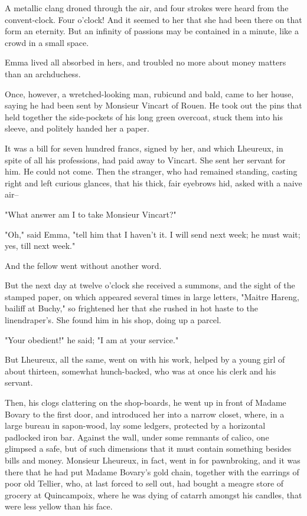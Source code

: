 \documentclass{tufte-book}
\begin{document}
A metallic clang droned through the air, and four strokes were heard
from the convent-clock. Four o'clock! And it seemed to her that she had
been there on that form an eternity. But an infinity of passions may be
contained in a minute, like a crowd in a small space.

Emma lived all absorbed in hers, and troubled no more about money
matters than an archduchess.

Once, however, a wretched-looking man, rubicund and bald, came to her
house, saying he had been sent by Monsieur Vincart of Rouen. He took out
the pins that held together the side-pockets of his long green overcoat,
stuck them into his sleeve, and politely handed her a paper.

It was a bill for seven hundred francs, signed by her, and which
Lheureux, in spite of all his professions, had paid away to Vincart. She
sent her servant for him. He could not come. Then the stranger, who
had remained standing, casting right and left curious glances, that his
thick, fair eyebrows hid, asked with a naive air--

"What answer am I to take Monsieur Vincart?"

"Oh," said Emma, "tell him that I haven't it. I will send next week; he
must wait; yes, till next week."

And the fellow went without another word.

But the next day at twelve o'clock she received a summons, and the sight
of the stamped paper, on which appeared several times in large letters,
"Maitre Hareng, bailiff at Buchy," so frightened her that she rushed in
hot haste to the linendraper's. She found him in his shop, doing up a
parcel.

"Your obedient!" he said; "I am at your service."

But Lheureux, all the same, went on with his work, helped by a young
girl of about thirteen, somewhat hunch-backed, who was at once his clerk
and his servant.

Then, his clogs clattering on the shop-boards, he went up in front
of Madame Bovary to the first door, and introduced her into a narrow
closet, where, in a large bureau in sapon-wood, lay some ledgers,
protected by a horizontal padlocked iron bar. Against the wall, under
some remnants of calico, one glimpsed a safe, but of such dimensions
that it must contain something besides bills and money. Monsieur
Lheureux, in fact, went in for pawnbroking, and it was there that he had
put Madame Bovary's gold chain, together with the earrings of poor old
Tellier, who, at last forced to sell out, had bought a meagre store
of grocery at Quincampoix, where he was dying of catarrh amongst his
candles, that were less yellow than his face.
\end{document}
